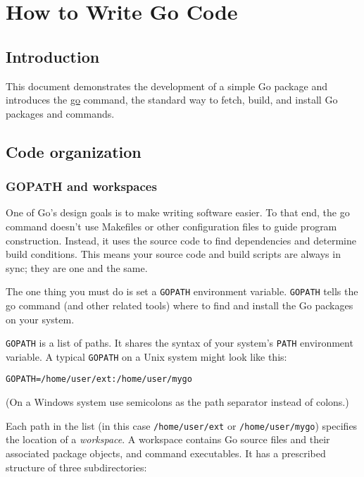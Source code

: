\cleardoublepage
{}
{}
\chapter*{How to Write Go Code}

\section *{Introduction}
This document demonstrates the development of a simple Go package
and introduces the \href{http://golang.org/cmd/go/}{go} command,
the standard way to fetch, build, and install Go packages and
commands.

\section*{Code organization}
\subsection*{GOPATH and workspaces}

One of Go's design goals is to make writing software easier. To
that end, the go command doesn't use Makefiles or other configuration
files to guide program construction. Instead, it uses the source
code to find dependencies and determine build conditions. This means
your source code and build scripts are always in sync; they are one
and the same.

The one thing you must do is set a \verb|GOPATH| environment variable.
\verb|GOPATH| tells the go command (and other related tools) where to find
and install the Go packages on your system.

\verb|GOPATH| is a list of paths. It shares the syntax of your
system's \verb|PATH| environment variable. A typical \verb|GOPATH|
on a Unix system might look like this:

\begin{Verbatim}[frame=single]
GOPATH=/home/user/ext:/home/user/mygo
\end{Verbatim}

(On a Windows system use semicolons as the path separator instead of colons.)

Each path in the list (in this case \verb|/home/user/ext| or
\verb|/home/user/mygo|) specifies the location of a \textit{workspace}.
A workspace contains Go source files and their associated package
objects, and command executables. It has a prescribed structure of
three subdirectories:

